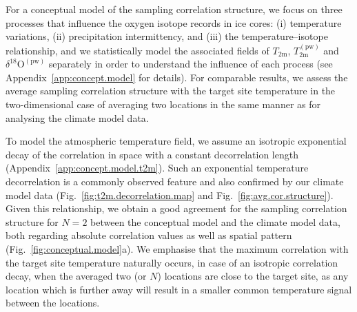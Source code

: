 \documentclass[cp, manuscript]{copernicus}
\begin{document}
For a conceptual model of the sampling correlation structure, we focus on three
processes that influence the oxygen isotope records in ice cores: (i)
temperature variations, (ii) precipitation intermittency, and (iii) the
temperature--isotope relationship, and we statistically model the associated
fields of $T_{\mathrm{2m}}$, $T_{2\mathrm{m}}^{\mathrm{(pw)}}$ and
$\delta^{18}\mathrm{O}^{\mathrm{(pw)}}$ separately in order to understand the
influence of each process (see Appendix~\ref{app:concept.model} for details).
For comparable results, we assess the average sampling correlation structure
with the target site temperature in the two-dimensional case of averaging two
locations in the same manner as for analysing the climate model data.

To model the atmospheric temperature field, we assume an isotropic exponential
decay of the correlation in space with a constant decorrelation length
(Appendix~\ref{app:concept.model.t2m}). Such an exponential temperature
decorrelation is a commonly observed feature \citep{Jones1997} and also
confirmed by our climate model data (Fig.~\ref{fig:t2m.decorrelation.map}
and Fig.~\ref{fig:avg.cor.structure}). Given this relationship, we obtain a good
agreement for the sampling correlation structure for $N=2$ between the
conceptual model and the climate model data, both regarding absolute correlation
values as well as spatial pattern (Fig.~\ref{fig:conceptual.model}a). We
emphasise that the maximum correlation with the target site temperature
naturally occurs, in case of an isotropic correlation decay, when the averaged
two (or $N$) locations are close to the target site, as any location which is
further away will result in a smaller common temperature signal between the
locations.
\end{document}
